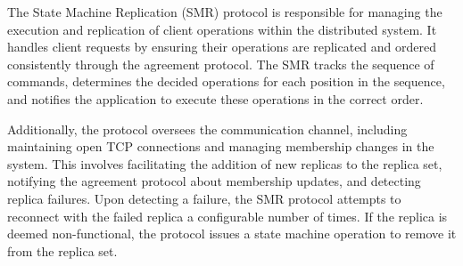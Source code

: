 \documentclass[sigconf]{acmart}
\begin{document}
The State Machine Replication (SMR) protocol is responsible for managing the execution and replication of client operations within the distributed system. It handles client requests by ensuring their operations are replicated and ordered consistently through the agreement protocol. The SMR tracks the sequence of commands, determines the decided operations for each position in the sequence, and notifies the application to execute these operations in the correct order.

Additionally, the protocol oversees the communication channel, including maintaining open TCP connections and managing membership changes in the system. This involves facilitating the addition of new replicas to the replica set, notifying the agreement protocol about membership updates, and detecting replica failures. Upon detecting a failure, the SMR protocol attempts to reconnect with the failed replica a configurable number of times. If the replica is deemed non-functional, the protocol issues a state machine operation to remove it from the replica set. \\
\end{document}
